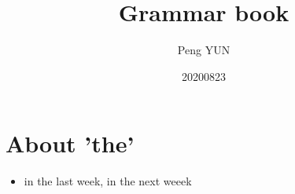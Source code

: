 \documentclass{article}
\title{Grammar book}
\author{Peng YUN}
\date{20200823}
\begin{document}
    \maketitle

\section{About 'the'}

\begin{itemize}
    \item in the last week, in the next weeek
\end{itemize}

% 
% 
\end{document}
